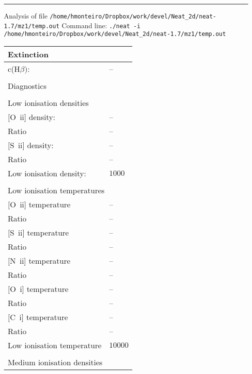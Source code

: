  \hrule
 \vspace{0.3cm}
 \noindent Analysis of file {\tt /home/hmonteiro/Dropbox/work/devel/Neat_2d/neat-1.7/mz1/temp.out}\newline
 \noindent Command line: {\tt ./neat -i /home/hmonteiro/Dropbox/work/devel/Neat_2d/neat-1.7/mz1/temp.out}\newline
 \begin{longtable}[l]{ll}
 \multicolumn{2}{l}{Extinction}\\ \hline
 c(H$\beta)$:                        & -- \\
 \vspace{0.2cm}\\\multicolumn{2}{l}{Diagnostics}\\ \hline
 \vspace{0.2cm}\\\multicolumn{2}{l}{Low ionisation densities}\\ \hline
 {}[O~{\sc ii}] density:             & -- \\
 Ratio                               & -- \\
 {}[S~{\sc ii}] density:             & -- \\
 Ratio                               & -- \\
 Low ionisation density:             & $ 1000$\\
 \vspace{0.2cm}\\\multicolumn{2}{l}{Low ionisation temperatures}\\ \hline
 {}[O~{\sc ii}] temperature          & -- \\
 Ratio                               & -- \\
 {}[S~{\sc ii}] temperature          & -- \\
 Ratio                               & -- \\
 {}[N~{\sc ii}] temperature          & -- \\
 Ratio                               & -- \\
 {}[O~{\sc i}] temperature           & -- \\
 Ratio                               & -- \\
 {}[C~{\sc i}] temperature           & -- \\
 Ratio                               & -- \\
 Low ionisation temperature          & $10000$\\
 \vspace{0.2cm}\\\multicolumn{2}{l}{Medium ionisation densities}\\ \hline

\end{longtable}
